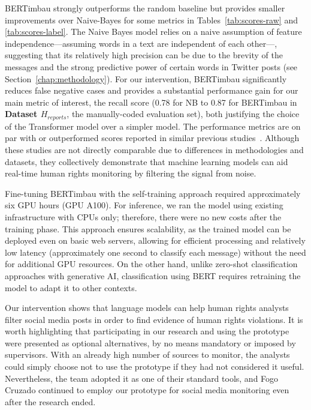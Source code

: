 \documentclass[11pt,letterpaper]{article}
\begin{document}
BERTimbau strongly outperforms the random baseline but provides smaller improvements over Naive-Bayes for some metrics in Tables~\ref{tab:scores-raw} and \ref{tab:scores-label}. The Naive Bayes model relies on a naive assumption of feature independence---assuming words in a text are independent of each other---, suggesting that its relatively high precision can be due to the brevity of the messages and the strong predictive power of certain words in Twitter posts (see Section~\ref{chap:methodology}). For our intervention, BERTimbau significantly reduces false negative cases and provides a substantial performance gain for our main metric of interest, the recall score (0.78 for NB to 0.87 for BERTimbau in \textbf{Dataset $ H_{reports} $}, the manually-coded evaluation set), both justifying the choice of the Transformer model over a simpler model. The performance metrics are on par with or outperformed scores reported in similar previous studies~\citep{taGANBERTAdversarialLearning2022,alhelbawyNLPPoweredHumanRights2020,gokhaleDeployingCotrainingAlgorithm2017}. Although these studies are not directly comparable due to differences in methodologies and datasets, they collectively demonstrate that machine learning models can aid real-time human rights monitoring by filtering the signal from noise.

Fine-tuning BERTimbau with the self-training approach required approximately six GPU hours (GPU A100). For inference, we ran the model using existing infrastructure with CPUs only; therefore, there were no new costs after the training phase. This approach ensures scalability, as the trained model can be deployed even on basic web servers, allowing for efficient processing and relatively low latency (approximately one second to classify each message) without the need for additional GPU resources. On the other hand, unlike zero-shot classification approaches with generative AI, classification using BERT requires retraining the model to adapt it to other contexts.

Our intervention shows that language models can help human rights analysts filter social media posts in order to find evidence of human rights violations. It is worth highlighting that participating in our research and using the prototype were presented as optional alternatives, by no means mandatory or imposed by supervisors. With an already high number of sources to monitor, the analysts could simply choose not to use the prototype if they had not considered it useful. Nevertheless, the team adopted it as one of their standard tools, and Fogo Cruzado continued to employ our prototype for social media monitoring even after the research ended. 
\end{document}

